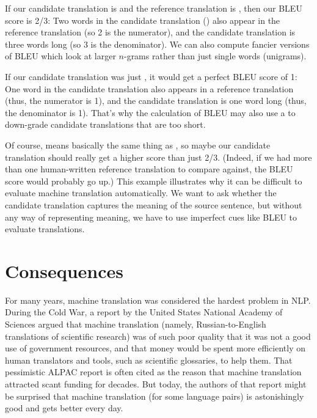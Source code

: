   If our candidate translation is  and the reference translation is , then our BLEU score is 2/3: Two words in the candidate translation () also appear in the reference translation (so 2 is the numerator), and the candidate translation is three words long (so 3 is the denominator). We can also compute fancier versions of BLEU which look at larger $n$-grams rather than just single words (unigrams). 

If our candidate translation was just , it would get a perfect BLEU score of 1: One word in the candidate translation also appears in a reference translation (thus, the numerator is 1), and the candidate translation is one word long (thus, the denominator is 1).  That's why the calculation of BLEU may also  use  a  to down-grade candidate translations that are too short.


Of course,  means basically the same thing as , so maybe our candidate translation should really get a higher score than just 2/3.  (Indeed, if we had more than one human-written reference translation to compare against, the BLEU score would probably go up.) This example illustrates why it can be difficult to evaluate machine translation automatically.  We want to ask whether the candidate translation captures the meaning of the source sentence, but without any way of representing meaning, we have to use  imperfect cues like BLEU to evaluate translations.



\section{Consequences}

For many years, machine translation was considered the hardest problem in NLP.  During the Cold War, a report by the United States National Academy of Sciences  \citep{alpac:1966} argued that machine translation (namely, Russian-to-English translations of scientific research) was of such poor quality that it was not a good use of government resources, and that money would be spent more efficiently on human translators and tools, such as scientific glossaries, to help them.  That pessimistic ALPAC report is often cited as the reason that machine translation attracted scant funding for decades.  But today, the authors of that report might be surprised that machine translation (for some language pairs) is astonishingly good and gets better every day. 

